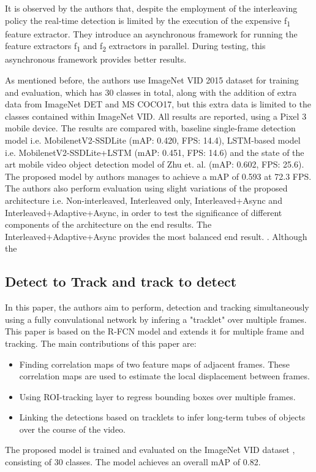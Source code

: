 \documentclass[conference]{IEEEtran}
\begin{document}
It is observed by the authors that, despite the employment of the interleaving policy the real-time detection is limited by the execution of the expensive f\textsubscript{1} feature extractor. They introduce an asynchronous framework for running the feature extractors f\textsubscript{1} and f\textsubscript{2} extractors in parallel. During testing, this asynchronous framework provides better results. \newline

As mentioned before, the authors use ImageNet VID 2015 dataset for training and evaluation, which has 30 classes in total, along with the addition of extra data from ImageNet DET and MS COCO17, but this extra data is limited to the classes contained within ImageNet VID. All results are reported, using a Pixel 3 mobile device. The results are compared with, baseline single-frame detection model i.e. MobilenetV2-SSDLite (mAP: 0.420, FPS: 14.4), LSTM-based model i.e. MobilenetV2-SSDLite+LSTM (mAP: 0.451, FPS: 14.6) and the state of the art mobile video object detection model of Zhu et. al. (mAP: 0.602, FPS: 25.6). The proposed model by authors manages to achieve a mAP of 0.593 at 72.3 FPS. The authors also perform evaluation using slight variations of the proposed architecture i.e. Non-interleaved, Interleaved only, Interleaved+Async and Interleaved+Adaptive+Async, in order to test the significance of different components of the architecture on the end results. The Interleaved+Adaptive+Async provides the most balanced end result. \cite{b37}. Although the 

\subsection{Detect to Track and track to detect\cite{b8}}

In this paper, the authors aim to perform, detection and tracking simultaneously using a fully convulational network by infering a "tracklet" over multiple frames.  This paper is based on the R-FCN\cite{b19} model and extends it for multiple frame and tracking. The main contributions of this paper are:
\begin{itemize}
	\item Finding correlation maps of two feature maps of adjacent frames. These correlation maps are used to estimate the local displacement between frames.
	\item Using ROI-tracking layer to regress bounding boxes over multiple frames.
	\item Linking the detections based on tracklets to infer long-term tubes of objects over the course of the video.
\end{itemize}
The proposed model is trained and evaluated on the ImageNet VID dataset \cite{b35}, consisting of 30 classes. The model achieves an overall mAP of 0.82. \newline
\end{document}
